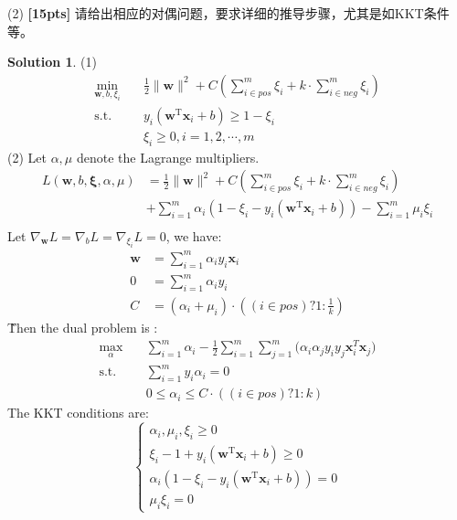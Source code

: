 \documentclass[a4paper,UTF8]{article}
\numberwithin{equation}{section}
\theoremstyle{definition}
\newtheorem*{solution}{Solution}
\begin{document}
(2) \textbf{[15pts]} 请给出相应的对偶问题，要求详细的推导步骤，尤其是如KKT条件等。
\begin{solution}
(1)  
\begin{equation} %
\begin{split}
\min_{\mathbf{w},b,\xi_i }& \quad \frac{1}{2} \lVert \mathbf{w} \rVert^2 + C(\sum_{i\in pos}^m\xi_i + k\cdot \sum_{i\in neg}^m\xi_i )\\
\text{s.t.}&  \quad y_i(\mathbf{w}^\mathrm{T}\mathbf{x}_i + b)\geq 1-\xi_i\\
& \quad \xi_i \geq 0, i = 1,2,\cdots,m 
\end{split}
\end{equation}
(2) 
Let $\alpha,  \mu $ denote the Lagrange multipliers. 
\begin{equation}
\begin{split}
L(\mathbf{w}, b, \mathbf{\xi},  \alpha,  \mu)  
&= \frac{1}{2} \lVert \mathbf{w} \rVert^2 + C(\sum_{i\in pos}^m\xi_i + k\cdot \sum_{i\in neg}^m\xi_i )\\
&+\sum_{i=1}^{m} \alpha_i(1-\xi_i-y_i(\mathbf{w}^\mathrm{T}\mathbf{x}_i + b) )  - \sum_{i=1}^{m}\mu_i\xi_i \\
\end{split} 
\end{equation} %
Let $\nabla_{\mathbf{w}}L =  \nabla_{b}L = \nabla_{\xi_i}L=0$, we have:
\begin{equation}
\begin{split} 
\mathbf{w} &=  \sum_{i=1}^{m} \alpha_i y_i \mathbf{x}_i \\
0 &= \sum_{i=1}^{m}\alpha_i y_i \\
C &= (\alpha_i + \mu_i ) \cdot ((i \in pos)?  1 : \frac{1}{k})
\end{split} 
\end{equation}
\~
Then the dual problem is : %
\begin{equation}
\begin{split}
\max_{\alpha} & \quad  \sum_{i=1}^{m}   \alpha_i  	- \frac{1}{2}  \sum_{i=1}^{m}  \sum_{j=1}^{m} \big(\alpha_i  \alpha_jy_iy_j \mathbf{x}_i^T\mathbf{x}_j\big)  \\
\text{s.t.} &\quad  \sum_{i=1}^{m}y_i\alpha_i = 0 \\
&\quad 0 \leq  {\alpha}_i \leq C \cdot ((i \in pos)? 1 : k )
\end{split} 
\end{equation}
The KKT conditions are: %
\begin{displaymath}
 \left\{ \begin{array}{ll}
 \alpha_i,  \mu_i, \xi_i   \geq 0\\
\xi_i -1 +  y_i (\mathbf{w}^\mathrm{T}\mathbf{x}_i + b) \geq 0 \\
\alpha_i(1-\xi_i-y_i(\mathbf{w}^\mathrm{T}\mathbf{x}_i + b)) = 0\\
\mu_i \xi_i = 0
  \end{array} \right.
\end{displaymath}

\end{solution}
\end{document}
